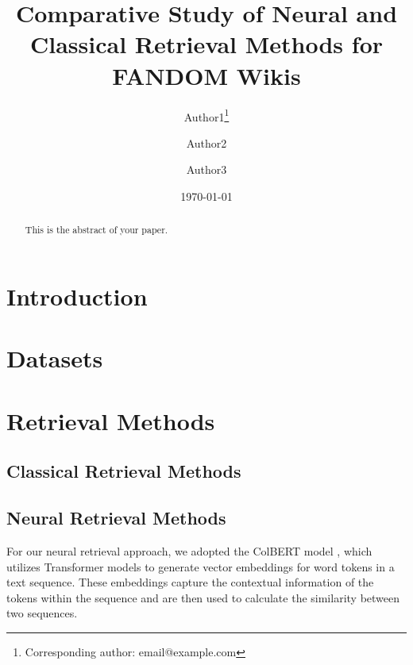 \documentclass{article}
\title{Comparative Study of Neural and Classical Retrieval Methods for FANDOM Wikis}
\author{Author1\thanks{Corresponding author: email@example.com} \and Author2 \and Author3}
\date{\today}
\begin{document}
\maketitle

\begin{abstract}
This is the abstract of your paper.
\end{abstract}

\section{Introduction}

\section{Datasets}

\section{Retrieval Methods}
\subsection{Classical Retrieval Methods}

\subsection{Neural Retrieval Methods}
For our neural retrieval approach, we adopted the ColBERT \cite{khattab2020colbert} model , which utilizes Transformer models to generate vector embeddings for word tokens in a text sequence. These embeddings capture the contextual information of the tokens within the sequence and are then used to calculate the similarity between two sequences.
\end{document}
